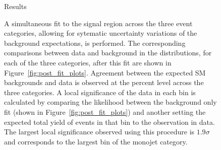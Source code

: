 \begin{figure}[hbtp]
\begin{section}{Results}

A simultaneous fit to the signal region across the three event categories,
allowing for sytematic uncertainty variations of the background expectations, is
performed.  The corresponding comparisons between data and background in the
\ETm distributions, for each of the three categories, after this fit are shown
in Figure~\ref{fig:post_fit_plots}.   Agreement between the expected SM
backgrounds and data is observed at the percent level across the three
categories. A local significance of the data in each bin is calculated by
comparing the likelihood between the background only fit (shown in
Figure~\ref{fig:post_fit_plots}) and another setting the expected total yield of
events in that bin to the observation in data. The largest local significance
observed using this procedure is $1.9\sigma$ and corresponds to the largest \ETm
bin of the monojet category.



\end{section}
\end{figure}
